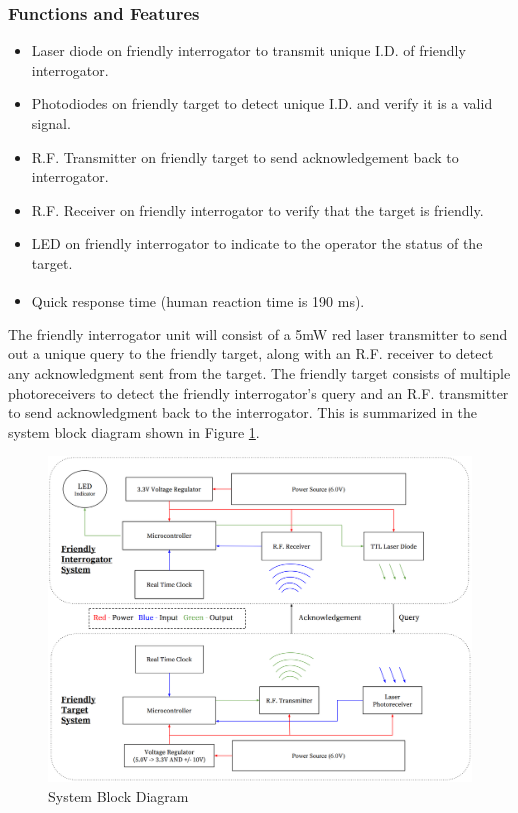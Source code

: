 \documentclass[letterpaper,10pt]{article}
\begin{document}
\begin{spacing}{1.15}
\subsubsection{Functions and Features}
\begin{itemize}
	\item Laser diode on friendly interrogator to transmit unique I.D. of friendly interrogator.
	\item Photodiodes on friendly target to detect unique I.D. and verify it is a valid signal.
	\item R.F. Transmitter on friendly target to send acknowledgement back to interrogator.
	\item R.F. Receiver on friendly interrogator to verify that the target is friendly.
	\item LED on friendly interrogator to indicate to the operator the status of the target.
	\item Quick response time (human reaction time is 190 ms\textsuperscript{\cite{Reaction_Times}}).
\end{itemize}
\clearpage

The friendly interrogator unit will consist of a 5mW red laser transmitter to send out a unique query to the friendly target, along with an R.F. receiver to detect any acknowledgment sent from the target. The friendly target consists of multiple photoreceivers to detect the friendly interrogator's query and an R.F. transmitter to send acknowledgment back to the interrogator. This is summarized in the system block diagram shown in Figure \ref{fig:system-block-diagram}. 


\begin{figure} [H]
	\centering
	\includegraphics[scale=0.45]{System_Block_Diagram.png}
	\caption{System Block Diagram\label{fig:system-block-diagram}}
\end{figure}


\end{spacing}
\end{document}
